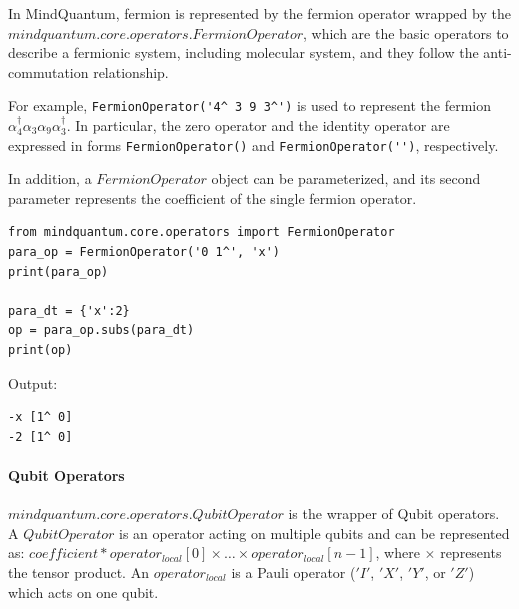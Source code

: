 In MindQuantum, fermion is represented by the fermion operator wrapped by the $mindquantum.core.operators.FermionOperator$, which are the basic operators to describe a fermionic system, including molecular system, and they follow the anti-commutation relationship. 

For example, \verb|FermionOperator('4^ 3 9 3^')| is used to represent the fermion $\alpha_4^\dagger \alpha_3 \alpha_9 \alpha_3^\dagger$. In particular, the zero operator and the identity operator are expressed in forms \verb|FermionOperator()| and \verb|FermionOperator('')|, respectively. 

In addition, a $FermionOperator$ object can be parameterized, and its second parameter represents the coefficient of the single fermion operator. 

\begin{lstlisting}
from mindquantum.core.operators import FermionOperator
para_op = FermionOperator('0 1^', 'x')
print(para_op)

para_dt = {'x':2}
op = para_op.subs(para_dt)
print(op)
\end{lstlisting}
Output: 
\begin{lstlisting}
-x [1^ 0]
-2 [1^ 0]
\end{lstlisting}

\paragraph{Qubit Operators}
$mindquantum.core.operators.QubitOperator$ is the wrapper of Qubit operators. A $QubitOperator$ is an operator acting on multiple qubits and can be represented as: $coefficient * operator_{local}[0] × … × operator_{local}[n-1]$, where $×$ represents the tensor product. An $operator_{local}$ is a Pauli operator ($'I'$, $'X'$, $'Y'$, or $'Z'$) which acts on one qubit. 

